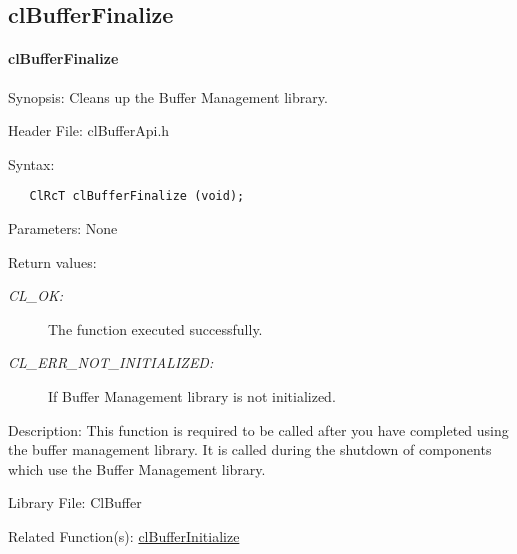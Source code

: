 \newpage

\subsection{clBufferFinalize}
\hypertarget{pagebuf102}{}\paragraph{cl\-Buffer\-Finalize}\label{pagebuf102}
\begin{Desc}
\item[Synopsis:]Cleans up the Buffer Management library.\end{Desc}
\begin{Desc}
\item[Header File:]clBufferApi.h\end{Desc}
\begin{Desc}
\item[Syntax:]

\footnotesize\begin{verbatim}   ClRcT clBufferFinalize (void);
\end{verbatim}
\normalsize
\end{Desc}
\begin{Desc}
\item[Parameters:]None\end{Desc}
\begin{Desc}
\item[Return values:]
\begin{description}
\item[{\em CL\_\-OK:}]The function executed successfully. \item[{\em CL\_\-ERR\_\-NOT\_\-INITIALIZED:}]If Buffer Management library is not initialized.\end{description}
\end{Desc}
\begin{Desc}
\item[Description:]This function is required to be called after you have completed using the buffer management library. It is
called during the shutdown of components which use the Buffer Management library.
\end{Desc}
\begin{Desc}
\item[Library File:]Cl\-Buffer\end{Desc}
\begin{Desc}
\item[Related Function(s):]\hyperlink{pagebuf102}{cl\-Buffer\-Initialize} \end{Desc}



